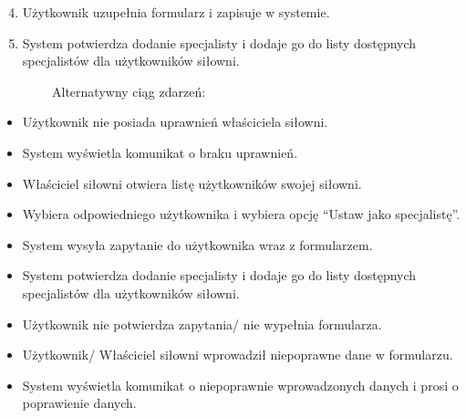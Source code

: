 \begin{enumerate}
\setcounter{enumi}{3}
\tightlist
\item
  {Użytkownik uzupełnia formularz i zapisuje w systemie.}
\item
  {System potwierdza dodanie specjalisty i dodaje go do listy dostępnych
  specjalistów dla użytkowników siłowni.}
\end{enumerate}

{~~~~~~~~Alternatywny ciąg zdarzeń:}

\begin{itemize}
\tightlist
\item
  {Użytkownik nie posiada uprawnień właściciela siłowni.}
\end{itemize}

\begin{itemize}
\tightlist
\item
  {System wyświetla komunikat o braku uprawnień.}
\end{itemize}

\begin{itemize}
\tightlist
\item
  {Właściciel siłowni otwiera listę użytkowników swojej siłowni.}
\end{itemize}

\begin{itemize}
\tightlist
\item
  {Wybiera odpowiedniego użytkownika i wybiera opcję ``Ustaw jako
  specjalistę''.}
\item
  {System wysyła zapytanie do użytkownika wraz z formularzem.}
\item
  {System potwierdza dodanie specjalisty i dodaje go do listy dostępnych
  specjalistów dla użytkowników siłowni.}
\end{itemize}

\begin{itemize}
\tightlist
\item
  {Użytkownik nie potwierdza zapytania/ nie wypełnia formularza.}
\item
  {Użytkownik/ Właściciel siłowni wprowadził niepoprawne dane w
  formularzu.}
\end{itemize}

\begin{itemize}
\tightlist
\item
  {System wyświetla komunikat o niepoprawnie wprowadzonych danych i
  prosi o poprawienie danych.\\
  }
\end{itemize}

